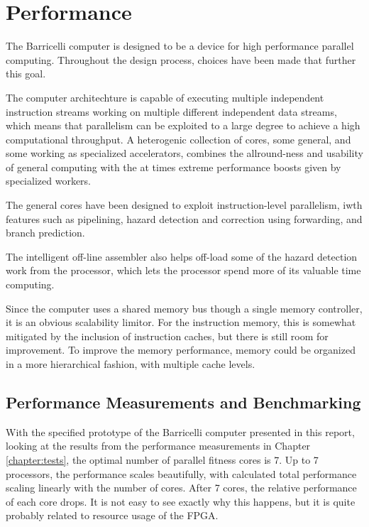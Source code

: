 \section{Performance}

The Barricelli computer is designed to be a device for high performance parallel computing.
Throughout the design process, choices have been made that further this goal.

The computer architechture is capable of executing multiple independent instruction streams working on multiple different independent data streams, which means that parallelism can be exploited to a large degree to achieve a high computational throughput.
A heterogenic collection of cores, some general, and some working as specialized accelerators, combines the allround-ness and usability of general computing with the at times extreme performance boosts given by specialized workers.

The general cores have been designed to exploit instruction-level parallelism, iwth features such as pipelining, hazard detection and correction using forwarding, and branch prediction.

The intelligent off-line assembler also helps off-load some of the hazard detection work from the processor, which lets the processor spend more of its valuable time computing.

Since the computer uses a shared memory bus though a single memory controller, it is an obvious scalability limitor.
For the instruction memory, this is somewhat mitigated by the inclusion of instruction caches, but there is still room for improvement.
To improve the memory performance, memory could be organized in a more hierarchical fashion, with multiple cache levels.

\subsection{Performance Measurements and Benchmarking}

With the specified prototype of the Barricelli computer presented in this report, looking at the results from the performance measurements in Chapter \vref{chapter:tests}, the optimal number of parallel fitness cores is 7.
Up to 7 processors, the performance scales beautifully, with calculated total performance scaling linearly with the number of cores.
After 7 cores, the relative performance of each core drops.
It is not easy to see exactly why this happens, but it is quite probably related to resource usage of the FPGA.

